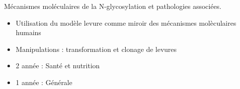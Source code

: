 \documentclass[10pt,a4paper,ragged2e,withhyper]{cv}
\begin{document}
\begin{paracol}{2}
            \divider
            
            Mécanismes moléculaires de la N-glycosylation et pathologies associées.
            \smallbreak
            \begin{itemize}
                \item Utilisation du modèle levure comme miroir des mécanismes molèculaires humains
                \item Manipulations : transformation et clonage de levures
            \end{itemize}
        
            \begin{itemize}
                \item 2\ieme{} année : Santé et nutrition
                \item 1\ier{} année : Générale
            \end{itemize}
            \divider
            
            \divider
            
        
    \end{paracol}
\end{document}
